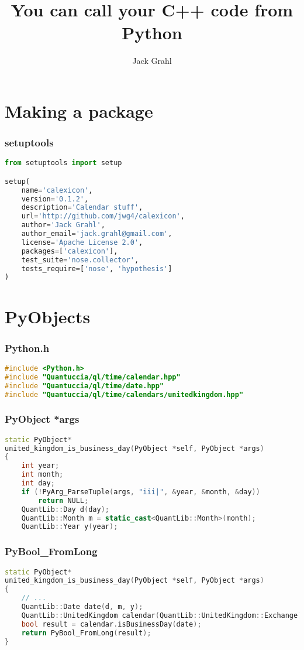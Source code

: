 \documentclass{beamer}
\title{You can call your C++ code from Python}
\author{Jack Grahl}
\institute{PrismFP Analytics}
\begin{document}
	\frame{\titlepage}
	\section[Section]{Making a package}
	\begin{frame}[fragile]
		\frametitle{setuptools}
		\begin{lstlisting}[language=Python]
from setuptools import setup

setup(
    name='calexicon',
    version='0.1.2',
    description='Calendar stuff',
    url='http://github.com/jwg4/calexicon',
    author='Jack Grahl',
    author_email='jack.grahl@gmail.com',
    license='Apache License 2.0',
    packages=['calexicon'],
    test_suite='nose.collector',
    tests_require=['nose', 'hypothesis']
)
		\end{lstlisting}
	\end{frame}

	\section[Section]{PyObjects}
	\begin{frame}[fragile]
		\frametitle{Python.h}
		\begin{lstlisting}[language=C++]
#include <Python.h>
#include "Quantuccia/ql/time/calendar.hpp"
#include "Quantuccia/ql/time/date.hpp"
#include "Quantuccia/ql/time/calendars/unitedkingdom.hpp"
		\end{lstlisting}
	\end{frame}

	\begin{frame}[fragile]
		\frametitle{PyObject *args}
		\begin{lstlisting}[language=C++]
   static PyObject*
united_kingdom_is_business_day(PyObject *self, PyObject *args)
{
    int year;
    int month;
    int day;
    if (!PyArg_ParseTuple(args, "iii|", &year, &month, &day))
        return NULL;
    QuantLib::Day d(day);
    QuantLib::Month m = static_cast<QuantLib::Month>(month);
    QuantLib::Year y(year);
		\end{lstlisting}
	\end{frame}

	\begin{frame}[fragile]
		\frametitle{PyBool_FromLong}
		\begin{lstlisting}[language=C++]
static PyObject*
united_kingdom_is_business_day(PyObject *self, PyObject *args)
{
    // ...
    QuantLib::Date date(d, m, y);
    QuantLib::UnitedKingdom calendar(QuantLib::UnitedKingdom::Exchange);
    bool result = calendar.isBusinessDay(date);
    return PyBool_FromLong(result);
}
		\end{lstlisting}
	\end{frame}
\end{document}
